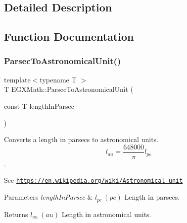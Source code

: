 \subsection{Detailed Description}


\subsection{Function Documentation}
\mbox{\label{group___e_g_x_math-_conversions-_length_conversions-_astronomical-_parsec-_astronomical_ga635dd871156c8bdd5e27198ba323380c}} 
\subsubsection{\texorpdfstring{Parsec\+To\+Astronomical\+Unit()}{ParsecToAstronomicalUnit()}}
{\footnotesize\ttfamily template$<$typename T $>$ \\
T E\+G\+X\+Math\+::\+Parsec\+To\+Astronomical\+Unit (\begin{DoxyParamCaption}\item[{const T}]{length\+In\+Parsec }\end{DoxyParamCaption})}



Converts a length in parsecs to astronomical units. \[ l_{au}= \frac{648000}{\pi} l_{pc} \]. 

See \href{https://en.wikipedia.org/wiki/Astronomical_unit}{\tt https\+://en.\+wikipedia.\+org/wiki/\+Astronomical\+\_\+unit} 
\begin{DoxyParams}{Parameters}
{\em length\+In\+Parsec} & $ l_{pc}\ (pc)$ Length in parsecs. \\
\hline
\end{DoxyParams}
\begin{DoxyReturn}{Returns}
$ l_{au}\ (au)$ Length in astronomical units. 
\end{DoxyReturn}
\mbox{\label{group___e_g_x_math-_conversions-_length_conversions-_astronomical-_parsec-_astronomical_gaf6681b9c24d89c83c48bf6dabb9a433d}} 
